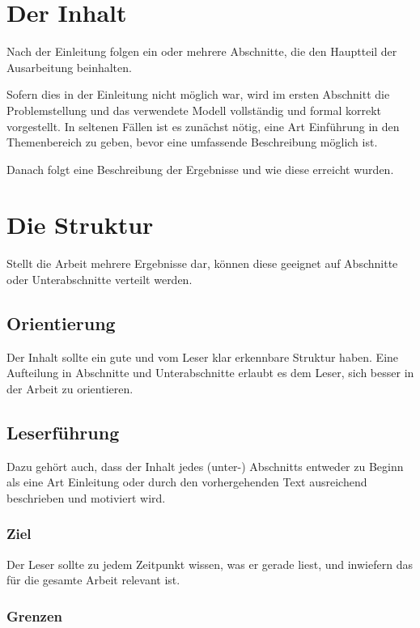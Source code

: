 \documentclass[draft]{tcs-seminar}
\begin{document}
\section{Der Inhalt}

Nach der Einleitung folgen ein oder mehrere Abschnitte,
die den Hauptteil der Ausarbeitung beinhalten.

Sofern dies in der Einleitung nicht möglich war,
wird im ersten Abschnitt die Problemstellung und das verwendete Modell
vollständig und formal korrekt vorgestellt.
In seltenen Fällen ist es zunächst nötig,
eine Art Einführung in den Themenbereich zu geben,
bevor eine umfassende Beschreibung möglich ist.

Danach folgt eine Beschreibung der Ergebnisse und wie diese erreicht wurden.


\section{Die Struktur}
\label{sec:struktur}

Stellt die Arbeit mehrere Ergebnisse dar,
können diese geeignet auf Abschnitte oder Unterabschnitte verteilt werden.

\subsection{Orientierung}

Der Inhalt sollte ein gute und vom Leser klar erkennbare Struktur haben.
Eine Aufteilung in Abschnitte und Unterabschnitte erlaubt es dem Leser,
sich besser in der Arbeit zu orientieren.

\subsection{Leserführung}

Dazu gehört auch, dass der Inhalt jedes (unter-) Abschnitts
entweder zu Beginn als eine Art Einleitung
oder durch den vorhergehenden Text ausreichend beschrieben und motiviert wird.

\subsubsection{Ziel}

Der Leser sollte zu jedem Zeitpunkt wissen,
was er gerade liest, und inwiefern das für die gesamte Arbeit relevant ist.

\subsubsection{Grenzen}
\end{document}
